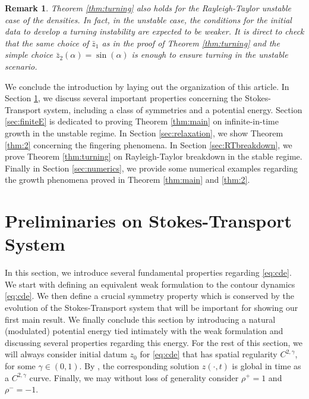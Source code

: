 \documentclass[11pt]{article}
\numberwithin{equation}{section}
\newtheorem{rmk}[thm]{Remark}
\begin{document}
\begin{rmk}
Theorem \ref{thm:turning} also holds for the Rayleigh-Taylor unstable case of the densities. In fact, in the unstable case, the conditions for the initial data to develop a turning instability are expected to be weaker. It is direct to check that the same choice of $\bar{z}_1$ as in the proof of Theorem \ref{thm:turning} and the simple choice $\bar{z}_2(\alpha) = \sin(\alpha)$ is enough to ensure turning in the unstable scenario.
\end{rmk}

We conclude the introduction by laying out the organization of this article. In Section \ref{sec:prelim}, we discuss several important properties concerning the Stokes-Transport system, including a class of symmetries and a potential energy. Section \ref{sec:finiteE} is dedicated to proving Theorem \ref{thm:main} on infinite-in-time growth in the unstable regime. In Section \ref{sec:relaxation}, we show Theorem \ref{thm:2} concerning the fingering phenomena. In Section \ref{sec:RTbreakdown}, we prove Theorem \ref{thm:turning} on Rayleigh-Taylor breakdown in the stable regime. Finally in Section \ref{sec:numerics}, we provide some numerical examples regarding the growth phenomena proved in Theorem \ref{thm:main} and \ref{thm:2}.

\section{Preliminaries on Stokes-Transport System}\label{sec:prelim}
In this section, we introduce several fundamental properties regarding \eqref{eq:cde}. We start with defining an equivalent weak formulation to the contour dynamics \eqref{eq:cde}. We then define a crucial symmetry property which is conserved by the evolution of the Stokes-Transport system that will be important for showing our first main result. We finally conclude this section by introducing a natural (modulated) potential energy tied intimately with the weak formulation and discussing several properties regarding this energy. For the rest of this section, we will always consider initial datum $z_0$ for \eqref{eq:cde} that has spatial regularity $C^{2,\gamma}$, for some $\gamma \in (0,1)$. By \cite[Corollary 1]{GGS25}, the corresponding solution $z(\cdot, t)$ is global in time as a $C^{2,\gamma}$ curve. Finally, we may without loss of generality consider $\rho^+ = 1$ and $\rho^- = -1$.
\end{document}
